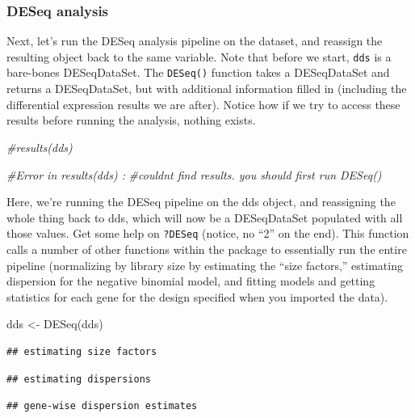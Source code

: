 \documentclass[
]{article}
\newenvironment{Shaded}{\begin{snugshade}}{\end{snugshade}}
\newcommand{\CommentTok}[1]{\textcolor[rgb]{0.56,0.35,0.01}{\textit{#1}}}
\newcommand{\FunctionTok}[1]{\textcolor[rgb]{0.00,0.00,0.00}{#1}}
\newcommand{\NormalTok}[1]{#1}
\newcommand{\OtherTok}[1]{\textcolor[rgb]{0.56,0.35,0.01}{#1}}
\begin{document}
\hypertarget{deseq-analysis}{%
\subsubsection{DESeq analysis}\label{deseq-analysis}}

Next, let's run the DESeq analysis pipeline on the dataset, and reassign
the resulting object back to the same variable. Note that before we
start, \texttt{dds} is a bare-bones DESeqDataSet. The \texttt{DESeq()}
function takes a DESeqDataSet and returns a DESeqDataSet, but with
additional information filled in (including the differential expression
results we are after). Notice how if we try to access these results
before running the analysis, nothing exists.

\begin{Shaded}
\begin{Highlighting}[]
\CommentTok{\#results(dds)}

\CommentTok{\#Error in results(dds) : }
\CommentTok{\#couldn\textquotesingle{}t find results. you should first run DESeq()}
\end{Highlighting}
\end{Shaded}

Here, we're running the DESeq pipeline on the dds object, and
reassigning the whole thing back to dds, which will now be a
DESeqDataSet populated with all those values. Get some help on
\texttt{?DESeq} (notice, no ``2'' on the end). This function calls a
number of other functions within the package to essentially run the
entire pipeline (normalizing by library size by estimating the ``size
factors,'' estimating dispersion for the negative binomial model, and
fitting models and getting statistics for each gene for the design
specified when you imported the data).

\begin{Shaded}
\begin{Highlighting}[]
\NormalTok{dds }\OtherTok{\textless{}{-}} \FunctionTok{DESeq}\NormalTok{(dds)}
\end{Highlighting}
\end{Shaded}

\begin{verbatim}
## estimating size factors
\end{verbatim}

\begin{verbatim}
## estimating dispersions
\end{verbatim}

\begin{verbatim}
## gene-wise dispersion estimates
\end{verbatim}
\end{document}
